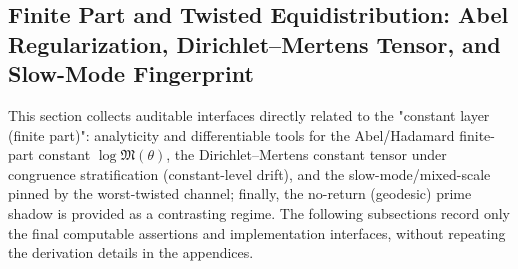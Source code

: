 \subsection{Finite Part and Twisted Equidistribution: Abel Regularization, Dirichlet--Mertens Tensor, and Slow-Mode Fingerprint}\label{subsec:zeta-finite-part-finite-constant}
This section collects auditable interfaces directly related to the "constant layer (finite part)": analyticity and differentiable tools for the Abel/Hadamard finite-part constant \(\log\mathfrak{M}(\theta)\), the Dirichlet--Mertens constant tensor under congruence stratification (constant-level drift), and the slow-mode/mixed-scale pinned by the worst-twisted channel; finally, the no-return (geodesic) prime shadow is provided as a contrasting regime. The following subsections record only the final computable assertions and implementation interfaces, without repeating the derivation details in the appendices.












